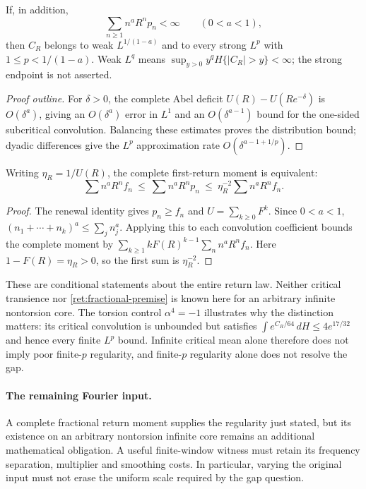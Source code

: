 \begin{theorem}\label{ret:critical-regularity}
If, in addition,
\begin{equation}\label{ret:fractional-premise}
 \sum_{n\geq1} n^aR^np_n<\infty\qquad(0<a<1),
\end{equation}
then $C_R$ belongs to weak $L^{1/(1-a)}$ and to every strong $L^p$ with $1\leq p<1/(1-a)$.
Weak $L^q$ means $\sup_{y>0}y^qH\{|C_R|>y\}<\infty$; the strong endpoint is not asserted.
\end{theorem}
\begin{proof}[Proof outline]
For $\delta>0$, the complete Abel deficit $U(R)-U(Re^{-\delta})$ is $O(\delta^a)$, giving an $O(\delta^a)$ error in $L^1$ and an $O(\delta^{a-1})$ bound for the one-sided subcritical convolution.
Balancing these estimates proves the distribution bound; dyadic differences give the $L^p$ approximation rate $O(\delta^{a-1+1/p})$.
\end{proof}

\begin{proposition}\label{ret:first-return-moment}
Writing $\eta_R=1/U(R)$, the complete first-return moment is equivalent:
\[
 \sum n^aR^nf_n\ \leq\ \sum n^aR^np_n
       \ \leq\ \eta_R^{-2}\sum n^aR^nf_n.
\]
\end{proposition}
\begin{proof}
The renewal identity gives $p_n\ge f_n$ and $U=\sum_{k\ge0}F^k$.
Since $0<a<1$, $(n_1+\cdots+n_k)^a\le\sum_jn_j^a$.
Applying this to each convolution coefficient bounds the complete moment by $\sum_{k\ge1}kF(R)^{k-1}\sum_n n^aR^nf_n$.
Here $1-F(R)=\eta_R>0$, so the first sum is $\eta_R^{-2}$.
\end{proof}

These are conditional statements about the entire return law.
Neither critical transience nor \eqref{ret:fractional-premise} is known here for an arbitrary infinite nontorsion core.
The torsion control $\alpha^4=-1$ illustrates why the distinction matters: its critical convolution is unbounded but satisfies $\int e^{C_R/64}\,dH\leq4e^{17/32}$ and hence every finite $L^p$ bound.
Infinite critical mean alone therefore does not imply poor finite-$p$ regularity, and finite-$p$ regularity alone does not resolve the gap.

\paragraph{The remaining Fourier input.}
A complete fractional return moment supplies the regularity just stated, but its existence on an arbitrary nontorsion infinite core remains an additional mathematical obligation.
A useful finite-window witness must retain its frequency separation, multiplier and smoothing costs.
In particular, varying the original input must not erase the uniform scale required by the gap question.

